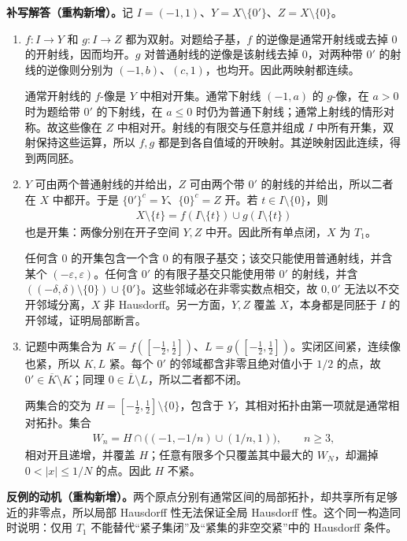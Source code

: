\documentclass[../../main.tex]{subfiles}%
\begin{document}
\begin{solution}
\textbf{补写解答（重构新增）。}记 $I=(-1,1)$、$Y=X\setminus\{0'\}$、$Z=X\setminus\{0\}$。
\begin{enumerate}
\item $f:I\to Y$ 和 $g:I\to Z$ 都为双射。对题给子基，$f$ 的逆像是通常开射线或去掉 $0$ 的开射线，因而均开。$g$ 对普通射线的逆像是该射线去掉 $0$，对两种带 $0'$ 的射线的逆像则分别为 $(-1,b)$、$(c,1)$，也均开。因此两映射都连续。

通常开射线的 $f$-像是 $Y$ 中相对开集。通常下射线 $(-1,a)$ 的 $g$-像，在 $a>0$ 时为题给带 $0'$ 的下射线，在 $a\le0$ 时仍为普通下射线；通常上射线的情形对称。故这些像在 $Z$ 中相对开。射线的有限交与任意并组成 $I$ 中所有开集，双射保持这些运算，所以 $f,g$ 都是到各自值域的开映射。其逆映射因此连续，得到两同胚。
\item $Y$ 可由两个普通射线的并给出，$Z$ 可由两个带 $0'$ 的射线的并给出，所以二者在 $X$ 中都开。于是 $\{0'\}^c=Y$、$\{0\}^c=Z$ 开。若 $t\in I\setminus\{0\}$，则
\begin{align*}
X\setminus\{t\}=f(I\setminus\{t\})\cup g(I\setminus\{t\})
\end{align*}
也是开集：两像分别在开子空间 $Y,Z$ 中开。因此所有单点闭，$X$ 为 $T_1$。

任何含 $0$ 的开集包含一个含 $0$ 的有限子基交；该交只能使用普通射线，并含某个 $(-\varepsilon,\varepsilon)$。任何含 $0'$ 的有限子基交只能使用带 $0'$ 的射线，并含 $(( -\delta,\delta)\setminus\{0\})\cup\{0'\}$。这些邻域必在非零实数点相交，故 $0,0'$ 无法以不交开邻域分离，$X$ 非 Hausdorff。另一方面，$Y,Z$ 覆盖 $X$，本身都是同胚于 $I$ 的开邻域，证明局部断言。
\item 记题中两集合为 $K=f([-\tfrac12,\tfrac12])$、$L=g([-\tfrac12,\tfrac12])$。实闭区间紧，连续像也紧，所以 $K,L$ 紧。每个 $0'$ 的邻域都含非零且绝对值小于 $1/2$ 的点，故 $0'\in\overline K\setminus K$；同理 $0\in\overline L\setminus L$，所以二者都不闭。

两集合的交为 $H=[-\tfrac12,\tfrac12]\setminus\{0\}$，包含于 $Y$，其相对拓扑由第一项就是通常相对拓扑。集合
\begin{align*}
W_n=H\cap\bigl((-1,-1/n)\cup(1/n,1)\bigr),\qquad n\ge3,
\end{align*}
相对开且递增，并覆盖 $H$；任意有限多个只覆盖其中最大的 $W_N$，却漏掉 $0<|x|\le1/N$ 的点。因此 $H$ 不紧。
\end{enumerate}
\end{solution}
\begin{remark}
\textbf{反例的动机（重构新增）。}两个原点分别有通常区间的局部拓扑，却共享所有足够近的非零点，所以局部 Hausdorff 性无法保证全局 Hausdorff 性。这个同一构造同时说明：仅用 $T_1$ 不能替代“紧子集闭”及“紧集的非空交紧”中的 Hausdorff 条件。
\end{remark}
\end{document}

